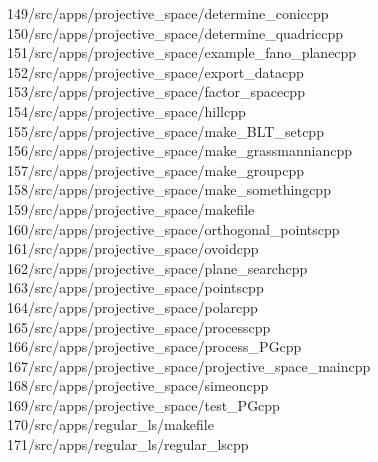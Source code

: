 \begin{tabbing}
149\>/src/apps/projective\_space/determine\_coniccpp\\[0pt]
150\>/src/apps/projective\_space/determine\_quadriccpp\\[0pt]
151\>/src/apps/projective\_space/example\_fano\_planecpp\\[0pt]
152\>/src/apps/projective\_space/export\_datacpp\\[0pt]
153\>/src/apps/projective\_space/factor\_spacecpp\\[0pt]
154\>/src/apps/projective\_space/hillcpp\\[0pt]
155\>/src/apps/projective\_space/make\_BLT\_setcpp\\[0pt]
156\>/src/apps/projective\_space/make\_grassmanniancpp\\[0pt]
157\>/src/apps/projective\_space/make\_groupcpp\\[0pt]
158\>/src/apps/projective\_space/make\_somethingcpp\\[0pt]
159\>/src/apps/projective\_space/makefile\\[0pt]
160\>/src/apps/projective\_space/orthogonal\_pointscpp\\[0pt]
161\>/src/apps/projective\_space/ovoidcpp\\[0pt]
162\>/src/apps/projective\_space/plane\_searchcpp\\[0pt]
163\>/src/apps/projective\_space/pointscpp\\[0pt]
164\>/src/apps/projective\_space/polarcpp\\[0pt]
165\>/src/apps/projective\_space/processcpp\\[0pt]
166\>/src/apps/projective\_space/process\_PGcpp\\[0pt]
167\>/src/apps/projective\_space/projective\_space\_maincpp\\[0pt]
168\>/src/apps/projective\_space/simeoncpp\\[0pt]
169\>/src/apps/projective\_space/test\_PGcpp\\[0pt]
170\>/src/apps/regular\_ls/makefile\\[0pt]
171\>/src/apps/regular\_ls/regular\_lscpp\\[0pt]

\end{tabbing}
